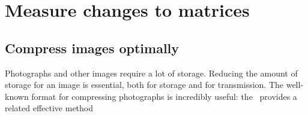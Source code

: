 
\section{Measure changes to matrices}
\label{sec:mctm}
\secttoc



\subsection{Compress images optimally}
\label{sec:ciio}


Photographs and other images require a lot of storage.
Reducing the amount of storage for an image is essential, both for storage and for transmission.
The well-known  format for compressing photographs is incredibly useful: the \svd\ provides a related effective method 

